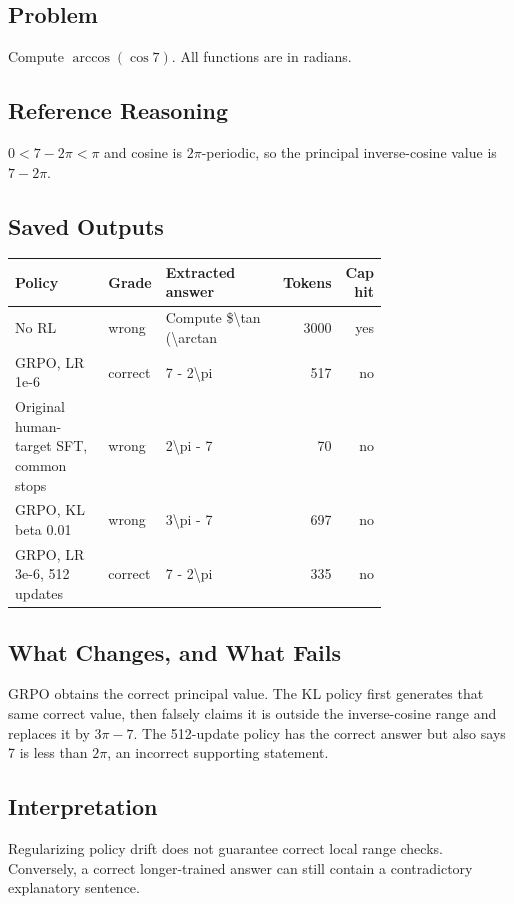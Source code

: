 \documentclass[10pt,letterpaper]{article}
\begin{document}
\subsection*{Problem}
Compute $\arccos (\cos 7).$  All functions are in radians.
\subsection*{Reference Reasoning}
$0<7-2\pi<\pi$ and cosine is $2\pi$-periodic, so the principal inverse-cosine value is $7-2\pi$.
\subsection*{Saved Outputs}
\small\begin{longtable}{p{0.29\linewidth}p{0.10\linewidth}p{0.35\linewidth}rr}\toprule Policy & Grade & Extracted answer & Tokens & Cap hit\\\midrule
No RL & wrong & Compute \$\textbackslash{}tan (\textbackslash{}arctan & 3000 & yes\\
GRPO, LR 1e-6 & correct & 7 - 2\textbackslash{}pi & 517 & no\\
Original human-target SFT, common stops & wrong & 2\textbackslash{}pi - 7 & 70 & no\\
GRPO, KL beta 0.01 & wrong & 3\textbackslash{}pi - 7 & 697 & no\\
GRPO, LR 3e-6, 512 updates & correct & 7 - 2\textbackslash{}pi & 335 & no\\
\bottomrule\end{longtable}\normalsize
\subsection*{What Changes, and What Fails}
GRPO obtains the correct principal value. The KL policy first generates that same correct value, then falsely claims it is outside the inverse-cosine range and replaces it by $3\pi-7$. The 512-update policy has the correct answer but also says 7 is less than $2\pi$, an incorrect supporting statement.
\subsection*{Interpretation}
Regularizing policy drift does not guarantee correct local range checks. Conversely, a correct longer-trained answer can still contain a contradictory explanatory sentence.
\end{document}

